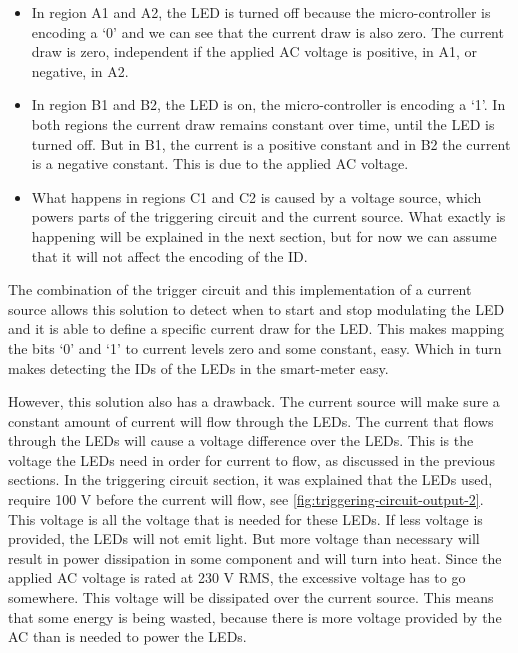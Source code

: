	\begin{itemize}

		\item In region A1 and A2, the LED is turned off because the micro-controller is encoding a `0' and we can see that the current draw is also zero.
		The current draw is zero, independent if the applied AC voltage is positive, in A1, or negative, in A2.


		\item In region B1 and B2, the LED is on, the micro-controller is encoding a `1'. 
		In both regions the current draw remains constant over time, until the LED is turned off.
		But in B1, the current is a positive constant and in B2 the current is a negative constant.
		This is due to the applied AC voltage.

		\item What happens in regions C1 and C2 is caused by a voltage source, which powers parts of the triggering circuit and the current source.
		What exactly is happening will be explained in the next section, but for now we can assume that it will not affect the encoding of the ID.

	\end{itemize}




	The combination of the trigger circuit and this implementation of a current source allows this solution to detect when to start and stop modulating the LED and it is able to define a specific current draw for the LED.
	This makes mapping the bits `0' and `1' to current levels zero and some constant, easy.
	Which in turn makes detecting the IDs of the LEDs in the smart-meter easy. %

	






	However, this solution also has a drawback.
	The current source will make sure a constant amount of current will flow through the LEDs.
	The current that flows through the LEDs will cause a voltage difference over the LEDs.
	This is the voltage the LEDs need in order for current to flow, as discussed in the previous sections.
	In the triggering circuit section, it was explained that the LEDs used, require 100 V before the current will flow, see \autoref{fig:triggering-circuit-output-2}.
	This voltage is all the voltage that is needed for these LEDs.
	If less voltage is provided, the LEDs will not emit light.
	But more voltage than necessary will result in power dissipation in some component and will turn into heat.
	Since the applied AC voltage is rated at 230 V RMS, the excessive voltage has to go somewhere.
	This voltage will be dissipated over the current source.
	This means that some energy is being wasted, because there is more voltage provided by the AC than is needed to power the LEDs.



